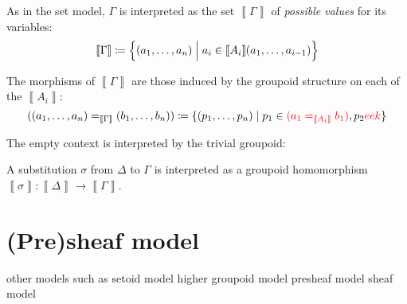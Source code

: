 \documentclass{article}
\theoremstyle{definition}
\renewcommand{\int}[1]
    {\left\llbracket #1 \right\rrbracket}       %
\renewcommand{\hom}[3][]{(#2 =_{#1} #3)}
\DeclareMathOperator{\id}{id}				    %
\newcommand{\defeq}{
	\mathrel{\mathrel{\mathop:}\mkern-1.2mu=}}	%
\newcommand{\n}{\hspace{-0.2em}}                %
\begin{document}
As in the set model, $\Gamma$ is interpreted as the set $\int{\Gamma}$ of \textit{possible values} for its variables: $$\int{\Gamma} \defeq \Big\{ (a_1,\ldots,a_n) \mathrel{\Big|} a_i \in \int{A_i}\n(a_1,\ldots,a_{i-1}) \Big\}$$

The morphisms of $\int{\Gamma}$ are those induced by the groupoid structure on each of the $\int{A_i}$:
$$\hom[\int{\Gamma}]{(a_1,\ldots,a_n)}{(b_1,\ldots,b_n)} \defeq \{ (p_1, \ldots, p_n) \mid p_1 \in {\color{red} \hom[\int{A_i}]{a_1}{b_1} }, p_2 {\color{red} eek} \}$$

The empty context is interpreted by the trivial groupoid:


A substitution $\sigma$ from $\Delta$ to $\Gamma$ is interpreted as a groupoid homomorphism $\int{\sigma}\colon \int{\Delta} \to \int{\Gamma}$.


\section{(Pre)sheaf model}

other models such as 
setoid model
higher groupoid model
presheaf model
sheaf model
\end{document}
